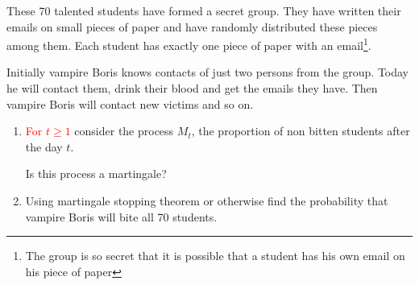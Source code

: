 \documentclass[12pt]{article}
\begin{document}
\begin{enumerate}
    These 70 talented students have formed a secret group. They have written their emails on small pieces of paper and have randomly distributed these pieces among them. Each student has exactly one piece of paper with an email\footnote{The group is so secret that it is possible that a student has his own email on his piece of paper}. 
    
    Initially vampire Boris knows contacts of just two persons from the group. Today he will contact them, drink their blood and get the emails they have. Then vampire Boris will contact new victims and so on.
    
    \begin{enumerate}
        \item \textcolor{red}{For $t\geq 1$} consider the process $M_t$, the proportion of non bitten students after the day $t$. 
        
        Is this process a martingale?
        
        \item Using martingale stopping theorem or otherwise find the probability that vampire Boris will bite all 70 students. 
    \end{enumerate}
 
 
\end{enumerate}
\end{document}
